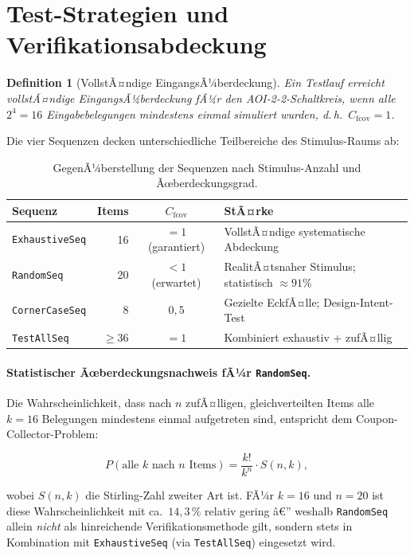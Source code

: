﻿\documentclass[12pt,a4paper]{report}
\newtheorem{definition}{Definition}[section]
\begin{document}
\section{Test-Strategien und Verifikationsabdeckung}
\label{subsec:test_strategien}

\begin{definition}[VollstÃ¤ndige EingangsÃ¼berdeckung]
Ein Testlauf erreicht \emph{vollstÃ¤ndige EingangsÃ¼berdeckung} fÃ¼r den
AOI-2-2-Schaltkreis, wenn alle $2^4 = 16$ Eingabebelegungen mindestens
einmal simuliert wurden, d.\,h.\
$C_{\mathrm{fcov}} = 1$.
\end{definition}

Die vier Sequenzen decken unterschiedliche Teilbereiche des Stimulus-Raums ab:

\begin{table}[H]
\centering
\begin{tabular}{|l|r|c|p{4.5cm}|}
\hline
\textbf{Sequenz} & \textbf{Items} & $C_{\mathrm{fcov}}$ & \textbf{StÃ¤rke} \\
\hline
\texttt{ExhaustiveSeq} & 16 & $=1$ (garantiert) & VollstÃ¤ndige systematische Abdeckung \\
\texttt{RandomSeq} & 20 & $<1$ (erwartet) & RealitÃ¤tsnaher Stimulus; statistisch $\approx\!91\%$ \\
\texttt{CornerCaseSeq} & 8 & $0{,}5$ & Gezielte EckfÃ¤lle; Design-Intent-Test \\
\texttt{TestAllSeq} & $\geq\!36$ & $=1$ & Kombiniert exhaustiv + zufÃ¤llig \\
\hline
\end{tabular}
\caption{GegenÃ¼berstellung der Sequenzen nach Stimulus-Anzahl und Ãœberdeckungsgrad.}
\label{tab:sequenz_vergleich}
\end{table}

\paragraph{Statistischer Ãœberdeckungsnachweis fÃ¼r \texttt{RandomSeq}.}
\label{par:random_coverage}
Die Wahrscheinlichkeit, dass nach $n$ zufÃ¤lligen, gleichverteilten Items
alle $k = 16$ Belegungen mindestens einmal aufgetreten sind, entspricht
dem Coupon-Collector-Problem:

\begin{equation}
    P(\text{alle } k \text{ nach } n \text{ Items}) = \frac{k!}{k^n} \cdot S(n, k),
\end{equation}

wobei $S(n,k)$ die Stirling-Zahl zweiter Art ist. FÃ¼r $k = 16$ und $n = 20$ ist
diese Wahrscheinlichkeit mit ca.\ $14{,}3\,\%$ relativ gering â€” weshalb
\texttt{RandomSeq} allein \emph{nicht} als hinreichende Verifikationsmethode
gilt, sondern stets in Kombination mit \texttt{ExhaustiveSeq} (via
\texttt{TestAllSeq}) eingesetzt wird.
\end{document}
